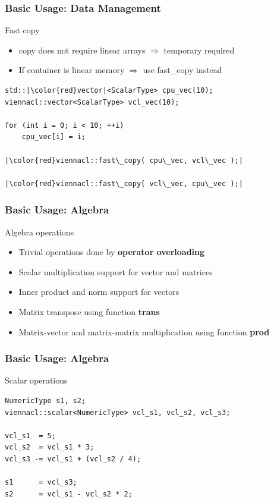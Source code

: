 \begin{frame}[fragile]
\frametitle{Basic Usage: Data Management}

\begin{block}{Fast copy}
  \begin{itemize}
   \item copy does not require linear arrays $\Rightarrow$ temporary required
   \item If container is linear memory $\Rightarrow$ use fast\_copy instead
  \end{itemize}
  
  \begin{lstlisting}
std::|\color{red}vector|<ScalarType> cpu_vec(10);
viennacl::vector<ScalarType> vcl_vec(10);

for (int i = 0; i < 10; ++i)
    cpu_vec[i] = i;
    
|\color{red}viennacl::fast\_copy( cpu\_vec, vcl\_vec );|

|\color{red}viennacl::fast\_copy( vcl\_vec, cpu\_vec );|
  \end{lstlisting}
\end{block}

\end{frame}




\begin{frame}
\frametitle{Basic Usage: Algebra}

\begin{block}{Algebra operations}
  \begin{itemize}
   \item Trivial operations done by \textbf{operator overloading}
   \item Scalar multiplication support for vector and matrices
   \item Inner product and norm support for vectors
   \item Matrix transpose using function \textbf{trans}
   \item Matrix-vector and matrix-matrix multiplication using function \textbf{prod}
  \end{itemize}
\end{block}

\end{frame}



\begin{frame}[fragile]
\frametitle{Basic Usage: Algebra}

\begin{block}{Scalar operations}
  \begin{lstlisting}
NumericType s1, s2;
viennacl::scalar<NumericType> vcl_s1, vcl_s2, vcl_s3;

vcl_s1  = 5;
vcl_s2  = vcl_s1 * 3;
vcl_s3 -= vcl_s1 + (vcl_s2 / 4);

s1      = vcl_s3;
s2      = vcl_s1 - vcl_s2 * 2;
  \end{lstlisting}
\end{block}

\end{frame}



